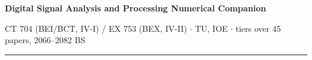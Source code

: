 \documentclass[10pt]{article}
\begin{document}
{\LARGE\bfseries Digital Signal Analysis and Processing \gap\textcolor{sub}{Numerical
Companion}}\par
{\footnotesize\color{sub} CT 704 (BEI/BCT, IV-I) / EX 753 (BEX, IV-II) $\cdot$ TU, IOE
$\cdot$ tiers over 45 papers, 2066--2082 BS}
\vspace{3pt}\hrule\vspace{4pt}




\end{document}
